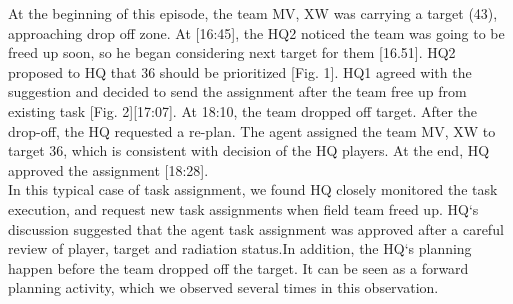 \noindent{} 
\hfill \break

At the beginning of this episode, the team MV, XW was carrying a target (43), approaching drop off zone. At [16:45], the HQ2 noticed the team was going to be freed up soon, so he began considering next target for them [16.51]. HQ2 proposed to HQ that 36 should be prioritized [Fig. 1]. HQ1 agreed with the suggestion and decided to send the assignment after the team free up from existing task [Fig. 2][17:07]. At 18:10, the team dropped off target. After the drop-off, the HQ requested a re-plan. The agent assigned the team MV, XW to target 36, which is consistent with decision of the HQ players. At the end, HQ approved the assignment [18:28].\\

In this typical case of task assignment, we found HQ closely monitored the task execution, and request new task assignments when field team freed up. HQ`s discussion suggested that the agent task assignment was approved after a careful review of player, target and radiation status.In addition, the HQ`s planning happen before the team dropped off the target. It can be seen as a forward planning activity, which we observed several times in this observation.\\

